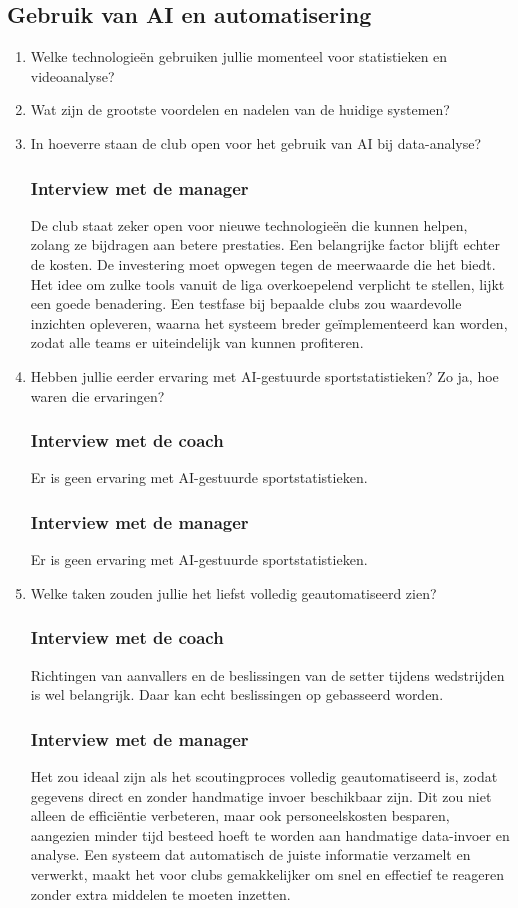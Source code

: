 \subsection{Gebruik van AI en automatisering}
\begin{enumerate}
  \item Welke technologieën gebruiken jullie momenteel voor statistieken en videoanalyse?
  \item Wat zijn de grootste voordelen en nadelen van de huidige systemen?
  \item In hoeverre staan de club open voor het gebruik van AI bij data-analyse?
  \subsubsection{Interview met de manager}
  De club staat zeker open voor nieuwe technologieën die kunnen helpen, zolang ze bijdragen aan betere prestaties. Een belangrijke factor blijft echter de kosten. De investering moet opwegen tegen de meerwaarde die het biedt. Het idee om zulke tools vanuit de liga overkoepelend verplicht te stellen, lijkt een goede benadering. Een testfase bij bepaalde clubs zou waardevolle inzichten opleveren, waarna het systeem breder geïmplementeerd kan worden, zodat alle teams er uiteindelijk van kunnen profiteren.
  \item Hebben jullie eerder ervaring met AI-gestuurde sportstatistieken? Zo ja, hoe waren die ervaringen?
  \subsubsection{Interview met de coach}
  Er is geen ervaring met AI-gestuurde sportstatistieken.
  \subsubsection{Interview met de manager}
  Er is geen ervaring met AI-gestuurde sportstatistieken.
  \item Welke taken zouden jullie het liefst volledig geautomatiseerd zien?
  \subsubsection{Interview met de coach}
  Richtingen van aanvallers en de beslissingen van de setter tijdens wedstrijden is wel belangrijk. Daar kan echt beslissingen op gebasseerd worden. 
  \subsubsection{Interview met de manager}
  Het zou ideaal zijn als het scoutingproces volledig geautomatiseerd is, zodat gegevens direct en zonder handmatige invoer beschikbaar zijn. Dit zou niet alleen de efficiëntie verbeteren, maar ook personeelskosten besparen, aangezien minder tijd besteed hoeft te worden aan handmatige data-invoer en analyse. Een systeem dat automatisch de juiste informatie verzamelt en verwerkt, maakt het voor clubs gemakkelijker om snel en effectief te reageren zonder extra middelen te moeten inzetten.
\end{enumerate}


